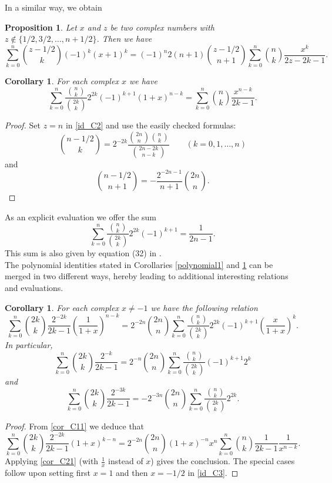 \documentclass[11pt,reqno]{amsart}
\theoremstyle{plain}
\numberwithin{equation}{section}
\newtheorem{proposition}[thm]{Proposition}
\newtheorem{corollary}[thm]{Corollary}
\begin{document}
In a similar way, we obtain

\begin{proposition}
Let $x$ and $z$ be two complex numbers with $z\notin\{1/2,3/2,\ldots,n+1/2\}$. Then we have
\begin{equation}\label{id_C2}
\sum_{k=0}^n \binom{z-1/2}{k}(-1)^k(x+1)^k= (-1)^n 2(n+1) \binom{z-1/2}{n+1}\sum_{k=0}^n \binom{n}{k} \frac{x^k}{2z-2k-1}.
\end{equation}
\end{proposition}

\begin{corollary}\label{polynomial2}
For each complex $x$ we have
\begin{equation}\label{cor_C21}
\sum_{k=0}^n \frac{\binom{n}{k}}{\binom{2k}{k}} 2^{2k} (-1)^{k+1} (1+x)^{n-k} = \sum_{k=0}^n \binom{n}{k} \frac{x^{n-k}}{2k-1}.
\end{equation}
\end{corollary}
\begin{proof}
Set $z=n$ in \eqref{id_C2} and use the easily checked formulas:
$$\binom{n-1/2}{k}=2^{-2k}\frac{\binom{2n}{n}\binom{n}{k}}{\binom{2n-2k}{n-k}}\qquad (k=0,1,\ldots,n)$$
and
$$\binom{n-1/2}{n+1}=-\frac{2^{-2n-1}}{n+1}\binom{2n}{n}.$$
\end{proof}

As an explicit evaluation we offer the sum
$$\sum_{k=0}^n \frac{\binom{n}{k}}{\binom{2k}{k}} 2^{2k} (-1)^{k+1} = \frac{1}{2n-1}.$$
This sum is also given by equation (32) in \cite{Adegoke}.\\ 

The polynomial identities stated in Corollaries \ref{polynomial1} and \ref{polynomial2} can be merged in two
different ways, hereby leading to additional interesting relations and evaluations.

\begin{corollary}
For each complex $x\neq -1$ we have the following relation
\begin{equation}\label{id_C3}
\sum_{k=0}^n \binom{2k}{k} \frac{2^{-2k}}{2k-1} \left (\frac{1}{1+x}\right )^{n-k}
= 2^{-2n} \binom{2n}{n} \sum_{k=0}^n \frac{\binom{n}{k}}{\binom{2k}{k}} 2^{2k} (-1)^{k+1}\left ( \frac{x}{1+x}\right )^{k}.
\end{equation}
In particular,
\begin{equation*}
\sum_{k=0}^n \binom{2k}{k} \frac{2^{-k}}{2k-1} =2^{-n}\binom{2n}{n}\sum_{k=0}^n\frac{\binom{n}{k}}{\binom{2k}{k}}(-1)^{k+1} 2^{k}
\end{equation*}
and
\begin{equation*}
\sum_{k=0}^n \binom{2k}{k} \frac{2^{-3k}}{2k-1} = - 2^{-3n} \binom{2n}{n} \sum_{k=0}^n \frac{\binom{n}{k}}{\binom{2k}{k}}2^{2k}.
\end{equation*}
\end{corollary}
\begin{proof}
From \eqref{cor_C11} we deduce that
\[ \sum_{k=0}^n \binom{2k}{k}\frac{2^{-2k}}{2k-1}(1+x)^{k-n}=2^{-2n}\binom{2n}{n}(1+x)^{-n}x^n\sum_{k=0}^n\binom{n}{k}\frac{1}{2k-1}\frac{1}{x^{n-k}}.\]
Applying \eqref{cor_C21} (with $\frac{1}{x}$ instead of $x$) gives the conclusion. The special cases follow upon setting first $x=1$ and then $x=-1/2$ in \eqref{id_C3}.
\end{proof}
\end{document}
